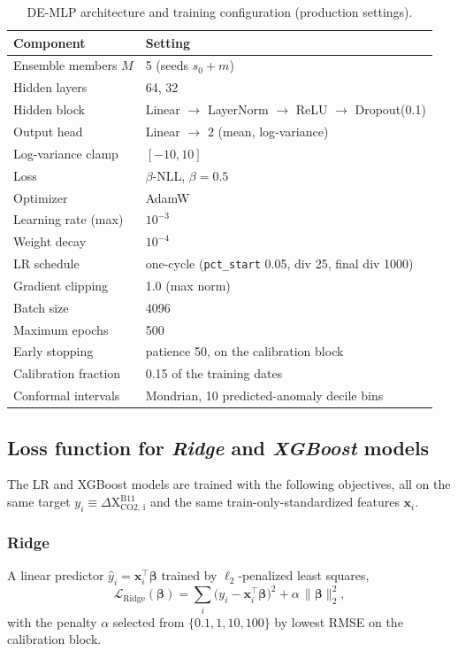 \begin{table}[t]
\centering
\caption{DE-MLP architecture and training configuration (production settings).}
\label{tab:hyperparams}
\begin{tabular}{@{}ll@{}}
\toprule
Component & Setting \\
\midrule
Ensemble members $M$        & 5 (seeds $s_0 + m$) \\
Hidden layers               & 64, 32 \\
Hidden block                & Linear $\to$ LayerNorm $\to$ ReLU $\to$ Dropout(0.1) \\
Output head                 & Linear $\to$ 2 (mean, log-variance) \\
Log-variance clamp          & $[-10, 10]$ \\
Loss                        & $\beta$-NLL, $\beta = 0.5$ \\
Optimizer                   & AdamW \\
Learning rate (max)         & $10^{-3}$ \\
Weight decay                & $10^{-4}$ \\
LR schedule                 & one-cycle (\texttt{pct\_start} 0.05, div 25, final div 1000) \\
Gradient clipping           & 1.0 (max norm) \\
Batch size                  & 4096 \\
Maximum epochs              & 500 \\
Early stopping              & patience 50, on the calibration block \\
Calibration fraction        & 0.15 of the training dates \\
Conformal intervals         & Mondrian, 10 predicted-anomaly decile bins \\
\bottomrule
\end{tabular}
\end{table}


\subsection{Loss function for \emph{Ridge} and \emph{XGBoost} models}

The LR and XGBoost models are trained with the following objectives, all on the same target $y_i \equiv \Delta \mathrm{X_{CO2,\,i}^{B11}}$ and the same
train-only-standardized features $\mathbf{x}_i$.

\subsubsection*{Ridge} 
A linear predictor $\hat{y}_i = \mathbf{x}_i^{\top}\bm{\beta}$
trained by $\ell_2$-penalized least squares,
%
\begin{equation}
  \mathcal{L}_{\mathrm{Ridge}}(\bm{\beta})
  = \sum_i \bigl(y_i - \mathbf{x}_i^{\top}\bm{\beta}\bigr)^{2}
  + \alpha\,\lVert\bm{\beta}\rVert_{2}^{2},
  \label{eq:ridge}
\end{equation}
%
with the penalty $\alpha$ selected from $\{0.1, 1, 10, 100\}$ by lowest RMSE on
the calibration block.


